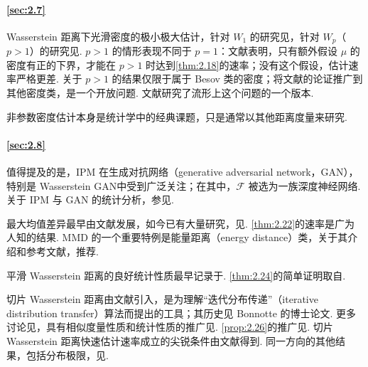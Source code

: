 \paragraph{\autoref{sec:2.7}}
Wasserstein 距离下光滑密度的极小极大估计，针对 $W_1$ 的研究见\cite{ref208,ref287}，针对 $W_p$（$p>1$）的研究见\cite{ref240}. $p>1$ 的情形表现不同于 $p=1$：文献\cite{ref240}表明，只有额外假设 $\mu$ 的密度有正的下界，才能在 $p>1$ 时达到\autoref{thm:2.18}的速率；没有这个假设，估计速率严格更差. 关于 $p>1$ 的结果仅限于属于 Besov 类的密度；将文献\cite{ref240}的论证推广到其他密度类，是一个开放问题. 文献\cite{ref111}研究了流形上这个问题的一个版本.

非参数密度估计本身是统计学中的经典课题，只是通常以其他距离度量来研究\cite{ref302}.

\paragraph{\autoref{sec:2.8}}
值得提及的是，IPM 在生成对抗网络（generative adversarial network，GAN），特别是 Wasserstein GAN\cite{ref22}中受到广泛关注；在其中，$\mathcal F$ 被选为一族深度神经网络. 关于 IPM 与 GAN 的统计分析，参见\cite{ref208,ref304}.

最大均值差异最早由文献\cite{ref50}发展，如今已有大量研究，见\cite{ref232}. \autoref{thm:2.22}的速率是广为人知的结果. MMD 的一个重要特例是能量距离（energy distance）类，关于其介绍和参考文献，推荐\cite[第1.2.4小节]{ref142}.

平滑 Wasserstein 距离的良好统计性质最早记录于\cite{ref150}. \autoref{thm:2.24}的简单证明取自\cite{ref238}.

切片 Wasserstein 距离由文献\cite{ref266}引入，是为理解“迭代分布传递”（iterative distribution transfer）算法\cite{ref258}而提出的工具；其历史见 Bonnotte 的博士论文\cite{ref49}. 更多讨论见\cite[第5.5.4节]{ref281}，具有相似度量性质和统计性质的推广见\cite{ref233}. \autoref{prop:2.26}的推广见\cite{ref222}. 切片 Wasserstein 距离快速估计速率成立的尖锐条件由文献\cite{ref41}得到. 同一方向的其他结果，包括分布极限，见\cite{ref151,ref222,ref241,ref245,ref254,ref325,ref326}.
